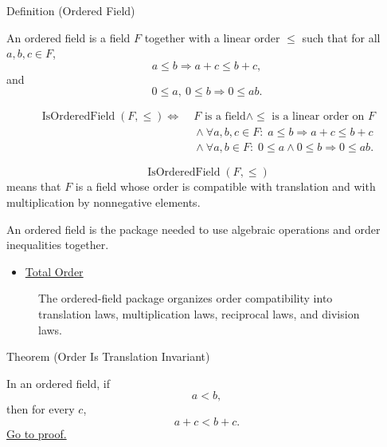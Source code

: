 \begin{definitionbox}{Definition (Ordered Field)}
\begin{definition}\label{def:ordered-field}
An ordered field is a field $F$ together with a linear order $\leq$ such that
for all $a,b,c\in F$,
\[
a\leq b \Rightarrow a+c\leq b+c,
\]
and
\[
0\leq a,\ 0\leq b \Rightarrow 0\leq ab.
\]
\end{definition}
\end{definitionbox}

\begin{remark*}
\[
\begin{aligned}
\operatorname{IsOrderedField}(F,\leq)
\Longleftrightarrow\;&
F\text{ is a field}
\land
\leq\text{ is a linear order on }F
\\
&{}\land
\forall a,b,c\in F{:}\; a\leq b \Longrightarrow a+c\leq b+c
\\
&{}\land
\forall a,b\in F{:}\; 0\leq a\land 0\leq b \Longrightarrow 0\leq ab.
\end{aligned}
\]
\end{remark*}

\begin{remark*}
\[
\operatorname{IsOrderedField}(F,\leq)
\]
means that \(F\) is a field whose order is compatible with translation and
with multiplication by nonnegative elements.
\end{remark*}

\begin{remark*}[Interpretation]
An ordered field is the package needed to use algebraic operations and order
inequalities together.
\end{remark*}

\begin{dependencies}
\begin{itemize}
  \item \hyperref[def:total-order]{Total Order}
\end{itemize}
\end{dependencies}

\begin{figure}[htbp]
\centering

\caption{The ordered-field package organizes order compatibility into
translation laws, multiplication laws, reciprocal laws, and division laws.}
\label{fig:ordered-field-dependency}
\end{figure}

\begin{theorembox}{Theorem (Order Is Translation Invariant)}
\begin{theorem}\label{thm:ordered-field-translation-invariant}
In an ordered field, if
\[
a<b,
\]
then for every $c$,
\[
a+c<b+c.
\]
\hyperref[prf:ordered-field-translation-invariant]{Go to proof.}
\end{theorem}
\end{theorembox}

